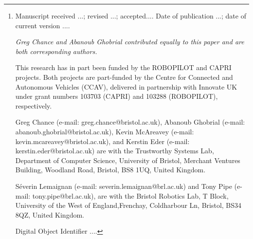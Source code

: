 \documentclass[letterpaper, 10 pt, journal, twoside]{IEEEtran}
\begin{document}
\author{Greg Chance, Abanoub Ghobrial, Kevin McAreavey, S\'everin Lemaignan, Tony Pipe, Kerstin Eder 
\thanks{{\footnotesize
Manuscript  
received ...;
revised ...;  
accepted.... 
Date of publication ...;
date of current version ....

\textit{Greg Chance and Abanoub Ghobrial contributed equally to this paper and are both corresponding authors.}
%

This research has in part been funded by the ROBOPILOT and CAPRI projects. Both projects are part-funded by the Centre for Connected and Autonomous Vehicles (CCAV), delivered in partnership with Innovate UK under grant numbers 103703 (CAPRI) and 103288 (ROBOPILOT), respectively.

Greg Chance (e-mail: greg.chance@bristol.ac.uk), 
Abanoub Ghobrial (e-mail: abanoub.ghobrial@bristol.ac.uk), 
Kevin McAreavey (e-mail: kevin.mcareavey@bristol.ac.uk), 
and 
Kerstin Eder (e-mail: kerstin.eder@bristol.ac.uk) 
are with the Trustworthy Systems Lab, Department of Computer Science, University of Bristol, Merchant Ventures Building, Woodland Road,  Bristol, BS8 1UQ, United Kingdom. 

S\'everin Lemaignan (e-mail: severin.lemaignan@brl.ac.uk)
and
Tony Pipe (e-mail: tony.pipe@brl.ac.uk), 
are with the Bristol Robotics Lab, T Block, University of the West of England,Frenchay, Coldharbour Ln, Bristol, BS34 8QZ, United Kingdom. 

Digital Object Identifier ....
}}}
%
%
\maketitle
%
\end{document}
